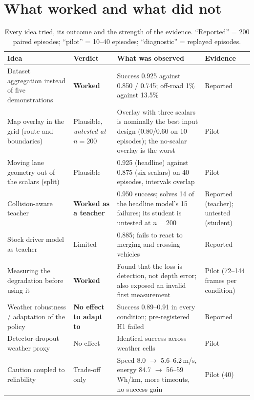 \section{What worked and what did not}\label{sec:lessons}

\begin{table}[H]\centering\small
\caption{Every idea tried, its outcome and the strength of the evidence. ``Reported'' = 200 paired episodes; ``pilot'' = 10--40 episodes; ``diagnostic'' = replayed episodes.}\label{tab:lessons}
\begin{tabularx}{\textwidth}{@{}>{\raggedright\arraybackslash}p{4.2cm}>{\raggedright\arraybackslash}p{1.9cm}X>{\raggedright\arraybackslash}p{1.9cm}@{}}\toprule
Idea & Verdict & What was observed & Evidence\\\midrule
Dataset aggregation instead of five demonstrations & \textbf{Worked} & Success 0.925 against 0.850 / 0.745; off-road 1\% against 13.5\% & Reported\\
Map overlay in the grid (route and boundaries) & Plausible, \emph{untested at $n=200$} & Overlay with three scalars is nominally the best input design (0.80/0.60 on 10 episodes); the no-scalar overlay is the worst & Pilot\\
Moving lane geometry out of the scalars (split) & Plausible & 0.925 (headline) against 0.875 (six scalars) on 40 episodes, intervals overlap & Pilot\\
Collision-aware teacher & \textbf{Worked as a teacher} & 0.950 success; solves 14 of the headline model's 15 failures; its student is untested at $n=200$ & Reported (teacher); untested (student)\\
Stock driver model as teacher & Limited & 0.885; fails to react to merging and crossing vehicles & Reported\\
Measuring the degradation before using it & \textbf{Worked} & Found that the loss is detection, not depth error; also exposed an invalid first measurement & Pilot (72--144 frames per condition)\\
Weather robustness / adaptation of the policy & \textbf{No effect to adapt to} & Success 0.89--0.91 in every condition; pre-registered H1 failed & Reported\\
Detector-dropout weather proxy & No effect & Identical success across weather cells & Pilot\\
Caution coupled to reliability & Trade-off only & Speed 8.0 $\to$ 5.6--6.2\,m/s, energy 84.7 $\to$ 56--59\,Wh/km, more timeouts, no success gain & Pilot (40)\\

\end{tabularx}
\end{table}
